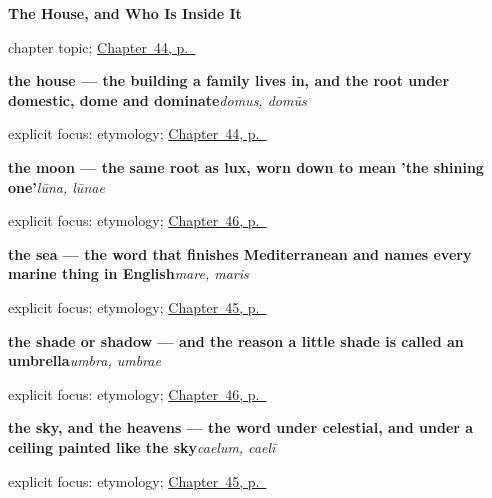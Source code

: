 \noindent\begin{minipage}[t]{\linewidth}
\raggedright
\textbf{The House, and Who Is Inside It}\par
\footnotesize chapter topic; \hyperref[ch:la-domus]{Chapter~44, p.~\pageref*{ch:la-domus}}
\end{minipage}\par\smallskip

\noindent\begin{minipage}[t]{\linewidth}
\raggedright
\textbf{the house — the building a family lives in, and the root under domestic, dome and dominate}\enspace\emph{domus, domūs}\par
\footnotesize explicit focus: etymology; \hyperref[ch:la-domus]{Chapter~44, p.~\pageref*{ch:la-domus}}
\end{minipage}\par\smallskip

\noindent\begin{minipage}[t]{\linewidth}
\raggedright
\textbf{the moon — the same root as lux, worn down to mean 'the shining one'}\enspace\emph{lūna, lūnae}\par
\footnotesize explicit focus: etymology; \hyperref[ch:la-lux]{Chapter~46, p.~\pageref*{ch:la-lux}}
\end{minipage}\par\smallskip

\noindent\begin{minipage}[t]{\linewidth}
\raggedright
\textbf{the sea — the word that finishes Mediterranean and names every marine thing in English}\enspace\emph{mare, maris}\par
\footnotesize explicit focus: etymology; \hyperref[ch:la-mundus]{Chapter~45, p.~\pageref*{ch:la-mundus}}
\end{minipage}\par\smallskip

\noindent\begin{minipage}[t]{\linewidth}
\raggedright
\textbf{the shade or shadow — and the reason a little shade is called an umbrella}\enspace\emph{umbra, umbrae}\par
\footnotesize explicit focus: etymology; \hyperref[ch:la-lux]{Chapter~46, p.~\pageref*{ch:la-lux}}
\end{minipage}\par\smallskip

\noindent\begin{minipage}[t]{\linewidth}
\raggedright
\textbf{the sky, and the heavens — the word under celestial, and under a ceiling painted like the sky}\enspace\emph{caelum, caelī}\par
\footnotesize explicit focus: etymology; \hyperref[ch:la-mundus]{Chapter~45, p.~\pageref*{ch:la-mundus}}
\end{minipage}\par\smallskip

